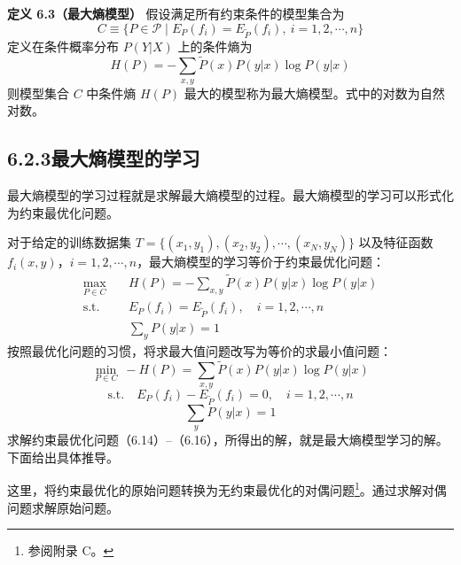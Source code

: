 \documentclass[UTF8,12pt,a4paper,fontset=fandol]{ctexart}
\begin{document}
\noindent\textbf{定义 6.3（最大熵模型）}\quad
假设满足所有约束条件的模型集合为
\begin{equation}
C\equiv\{P\in\mathcal{P}\mid E_P(f_i)=E_{\tilde{P}}(f_i),\ i=1,2,\cdots,n\}
\tag{6.12}
\end{equation}
定义在条件概率分布 $P(Y|X)$ 上的条件熵为
\begin{equation}
H(P)=-\sum_{x,y}\tilde{P}(x)P(y|x)\log P(y|x)
\tag{6.13}
\end{equation}
则模型集合 $C$ 中条件熵 $H(P)$ 最大的模型称为最大熵模型。式中的对数为自然对数。

\subsection*{6.2.3\quad 最大熵模型的学习}

最大熵模型的学习过程就是求解最大熵模型的过程。最大熵模型的学习可以形式化为约束最优化问题。

对于给定的训练数据集 $T=\{(x_1,y_1),(x_2,y_2),\cdots,(x_N,y_N)\}$ 以及特征函数 $f_i(x,y)$，$i=1,2,\cdots,n$，最大熵模型的学习等价于约束最优化问题：
\[
\begin{aligned}
\max_{P\in C}\quad &H(P)=-\sum_{x,y}\tilde{P}(x)P(y|x)\log P(y|x)\\
\mathrm{s.t.}\quad &E_P(f_i)=E_{\tilde{P}}(f_i),\quad i=1,2,\cdots,n\\
&\sum_y P(y|x)=1
\end{aligned}
\]
按照最优化问题的习惯，将求最大值问题改写为等价的求最小值问题：
\begin{equation}
\min_{P\in C}\ -H(P)=\sum_{x,y}\tilde{P}(x)P(y|x)\log P(y|x)
\tag{6.14}
\end{equation}
\begin{equation}
\mathrm{s.t.}\quad E_P(f_i)-E_{\tilde{P}}(f_i)=0,\quad i=1,2,\cdots,n
\tag{6.15}
\end{equation}
\begin{equation}
\sum_y P(y|x)=1
\tag{6.16}
\end{equation}
求解约束最优化问题（6.14）--（6.16），所得出的解，就是最大熵模型学习的解。下面给出具体推导。

这里，将约束最优化的原始问题转换为无约束最优化的对偶问题\footnote{参阅附录 C。}。通过求解对偶问题求解原始问题。
\end{document}
